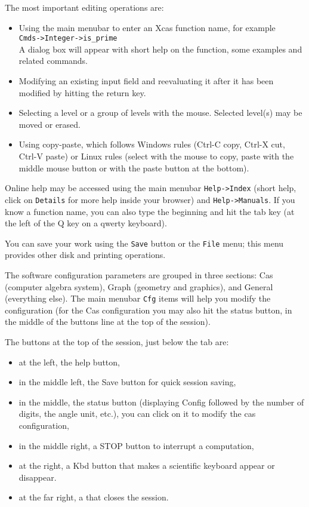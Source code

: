 \documentclass{article}
\begin{document}
The most important editing operations are:
\begin{itemize}
\item
Using the main menubar to enter an Xcas function name, for example\\
{\tt Cmds->Integer->is\_prime}\\
A dialog box will appear
with short help on the function, some examples and related
commands.
\item Modifying an existing input field and reevaluating it after
it has been modified by hitting the return key.
\item
Selecting a level or a group of levels with the mouse.
Selected level(s) may be moved or erased.
\item Using copy-paste, which follows Windows rules (Ctrl-C copy, Ctrl-X cut,
Ctrl-V paste) or Linux rules (select with the mouse to copy, paste with
the middle mouse button or with the paste button at the bottom).
\end{itemize}

Online help may be accessed using the main menubar {\tt Help->Index}
(short help, click on {\tt Details} for more help inside your browser) 
and {\tt Help->Manuals}. 
If you know a function name, you can also type the beginning and hit the
tab key (at the left of the Q key on a qwerty keyboard).

You can save your work using the {\tt Save} button or the
{\tt File} menu; this menu provides
other disk and printing operations.

The software configuration parameters are grouped in three sections:
Cas (computer algebra system), Graph (geometry and graphics), and General
(everything else). The main menubar {\tt Cfg} items will help
you modify the configuration (for the Cas configuration you may
also hit the status button, in the middle of the buttons line at 
the top of the session).

The buttons at the top of the session, just below the tab are:
\begin{itemize}
\item at the left, the help button,
\item in the middle left, the Save button for quick session saving,
\item in the middle, the status button 
(displaying Config followed by the number of digits,
the angle unit, etc.), you can click on it to modify
the cas configuration,
\item in the middle right, a STOP button to interrupt a computation, 
\item at the right, a Kbd button that makes
a scientific keyboard appear or disappear.
\item at the far right, a  that closes the session.
\end{itemize}
\end{document}
